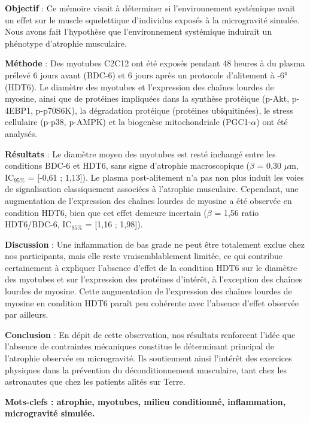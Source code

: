 \documentclass[11pt]{report}
\begin{document}
 \footnotesize{{\bf{Objectif}} : Ce mémoire visait à déterminer si l'environnement systémique avait un effet sur le muscle squelettique d'individus exposés à la microgravité simulée. Nous avons fait l'hypothèse que l'environnement systémique induirait un phénotype d'atrophie musculaire.
 	
 {\bf{Méthode}} : Des myotubes C2C12 ont été exposés pendant 48 heures à du plasma prélevé 6 jours avant (BDC-6) et 6 jours après un protocole d'alitement à -6° (HDT6). Le diamètre des myotubes et l'expression des chaînes lourdes de myosine, ainsi que de protéines impliquées dans la synthèse protéique (p-Akt, p-4EBP1, p-p70S6K), la dégradation protéique (protéines ubiquitinées), le stress cellulaire (p-p38, p-AMPK) et la biogenèse mitochondriale (PGC1-$\alpha$) ont été analysés.
 
 {\bf{Résultats}} : Le diamètre moyen des myotubes est resté inchangé entre les conditions BDC-6 et HDT6, sans signe d'atrophie macroscopique ($\beta$ = 0,30 $\mu$m, IC$_{95\%}$ = [-0,61 ; 1,13]). Le plasma post-alitement n'a pas non plus induit les voies de signalisation classiquement associées à l'atrophie musculaire. Cependant, une augmentation de l'expression des chaînes lourdes de myosine a été observée en condition HDT6, bien que cet effet demeure incertain ($\beta$ = 1,56 ratio HDT6/BDC-6, IC$_{95\%}$ = [1,16 ; 1,98]).
 
 {\bf{Discussion}} : Une inflammation de bas grade ne peut être totalement exclue chez nos participants, mais elle reste vraisemblablement limitée, ce qui contribue certainement à expliquer l'absence d'effet de la condition HDT6 sur le diamètre des myotubes et sur l'expression des protéines d'intérêt, à l'exception des chaînes lourdes de myosine. Cette augmentation de l'expression des chaînes lourdes de myosine en condition HDT6 paraît peu cohérente avec l'absence d'effet observée par ailleurs.
 
 {\bf{Conclusion}} : En dépit de cette observation, nos résultats renforcent l'idée que l'absence de contraintes mécaniques constitue le déterminant principal de l'atrophie observée en microgravité. Ils soutiennent ainsi l'intérêt des exercices physiques dans la prévention du déconditionnement musculaire, tant chez les astronautes que chez les patients alités sur Terre.}

\medskip

{\bf{Mots-clefs : atrophie, myotubes, milieu conditionné, inflammation, microgravité simulée.}}

\vspace{1\baselineskip}
\end{document}
